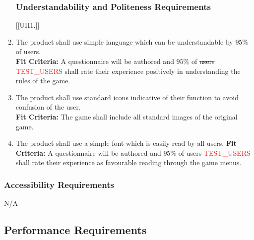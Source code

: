 \documentclass[12pt, titlepage]{article}
\begin{document}
\begin{enumerate}[{UH}1. ]
\subsubsection{Understandability and Politeness Requirements}
[{[{UH}1.]}]
    \item The product shall use simple language which can be understandable by $95$\% of users.\\
    \textbf{Fit Criteria:} A questionnaire will be authored and $95$\% of \sout{users} \textcolor{red}{TEST\_USERS} shall rate their experience positively in understanding the rules of the game.
    \item The product shall use standard icons indicative of their function to avoid confusion of the user.\\
    \textbf{Fit Criteria:} The game shall include all standard images of the original game.
    \item The product shall use a simple font which is easily read by all users.
    \textbf{Fit Criteria:} A questionnaire will be authored and $95$\% of \sout{users} \textcolor{red}{TEST\_USERS} shall rate their experience as favourable reading through the game menus.
\end{enumerate}

\subsubsection{Accessibility Requirements}
N/A



\subsection{Performance Requirements}
\end{document}
